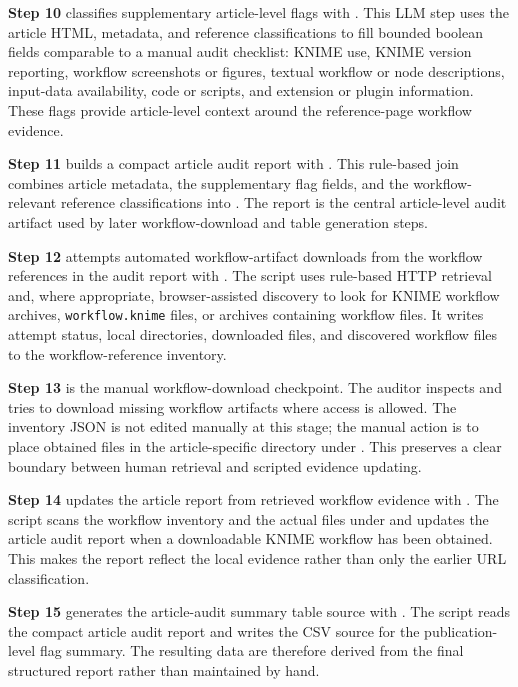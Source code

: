\documentclass[runningheads]{llncs}
\begin{document}
\textbf{Step 10} classifies supplementary article-level flags with
. This LLM step
uses the article HTML, metadata, and reference classifications to fill bounded
boolean fields comparable to a manual audit checklist: KNIME use, KNIME version
reporting, workflow screenshots or figures, textual workflow or node
descriptions, input-data availability, code or scripts, and extension or
plugin information. These flags provide article-level context around the
reference-page workflow evidence.

\textbf{Step 11} builds a compact article audit report with
. This rule-based join combines
article metadata, the supplementary flag fields, and the workflow-relevant
reference classifications into
. The report is the
central article-level audit artifact used by later workflow-download and table
generation steps.

\textbf{Step 12} attempts automated workflow-artifact downloads from the workflow
references in the audit report with
. The script uses rule-based
HTTP retrieval and, where appropriate, browser-assisted discovery to look for
KNIME workflow archives, \texttt{workflow.knime} files, or archives containing
workflow files. It writes attempt status, local directories, downloaded files,
and discovered workflow files to the workflow-reference inventory.

\textbf{Step 13} is the manual workflow-download checkpoint. The auditor inspects
 and
tries to download missing workflow artifacts where access is allowed. The
inventory JSON is not edited manually at this stage; the manual action is to
place obtained files in the article-specific directory under
. This preserves a clear boundary between human
retrieval and scripted evidence updating.

\textbf{Step 14} updates the article report from retrieved workflow evidence with
. The script scans
the workflow inventory and the actual files under 
and updates the article audit report when a downloadable KNIME workflow has
been obtained. This makes the report reflect the local evidence rather than
only the earlier URL classification.

\textbf{Step 15} generates the article-audit summary table source with
. The script reads the compact
article audit report and writes the CSV source for the publication-level flag
summary. The resulting data are therefore
derived from the final structured report rather than maintained by hand.
\end{document}
